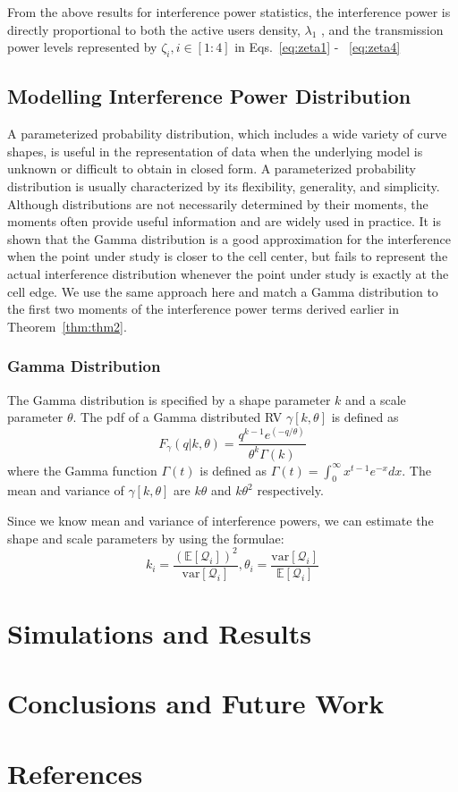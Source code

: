 \documentclass[titlepage]{article}
\begin{document}
\par From the above results for interference power statistics, the interference power is directly proportional to both
the active users density, $\lambda_1$ , and the transmission power levels
represented by $\zeta_i , i \in [1:4] $ in Eqs.~\ref{eq:zeta1} - ~\ref{eq:zeta4}

\subsection{Modelling Interference Power Distribution}
A parameterized probability distribution, which includes a
wide variety of curve shapes, is useful in the representation of
data when the underlying model is unknown or difficult to obtain in closed form. A parameterized probability distribution is
usually characterized by its flexibility, generality, and simplicity. Although distributions are not necessarily determined by
their moments, the moments often provide useful information
and are widely used in practice. It is shown that the Gamma
distribution is a good approximation for the interference when
the point under study is closer to the cell center, but fails
to represent the actual interference distribution whenever the
point under study is exactly at the cell edge. We use the same
approach here and match a Gamma distribution to the first
two moments of the interference power terms derived earlier
in Theorem~\ref{thm:thm2}.
\subsubsection{Gamma Distribution}
The Gamma distribution is specified by a shape parameter $k$ and a scale parameter $\theta$. The pdf of a Gamma distributed RV $\gamma[k,\theta]$ is defined as 
\begin{equation*}
F_\gamma(q|k,\theta) = \frac{q^{k-1}e^(-q/\theta)}{\theta^k\Gamma(k)}
\end{equation*}
where the Gamma function $\Gamma(t)$ is defined as $\Gamma(t) = \int_0^{\infty}x^{t-1}e^{-x}dx$. The mean and variance of $\gamma[k,\theta]$ are $k\theta$ and $k\theta^2$ respectively.
\par
Since we know mean and variance of interference powers, we can estimate the shape and scale parameters by using the formulae:
\begin{equation}
k_i = \frac{(\mathbb{E}[\mathcal{Q}_i])^2}{\text{var}[\mathcal{Q}_i]}, \theta_i =\frac{\text{var}[\mathcal{Q}_i]}{\mathbb{E}[\mathcal{Q}_i]}
\end{equation}

\section{Simulations and Results}

\section{Conclusions and Future Work}

\section{References}
\end{document}
